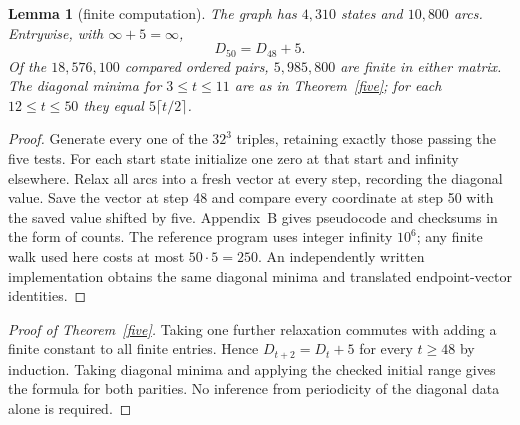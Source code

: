 \documentclass[11pt,a4paper]{article}
\newtheorem{lemma}[theorem]{Lemma}
\begin{document}
\begin{lemma}[finite computation]\label{finite}
The graph has $4{,}310$ states and $10{,}800$ arcs. Entrywise, with $\infty+5=\infty$,
\[
                 D_{50}=D_{48}+5.
\]
Of the $18{,}576{,}100$ compared ordered pairs, $5{,}985{,}800$ are finite in either matrix. The diagonal minima for $3\le t\le11$ are as in Theorem~\ref{five}; for each $12\le t\le50$ they equal $5\lceil t/2\rceil$.
\end{lemma}
\begin{proof}
Generate every one of the $32^3$ triples, retaining exactly those passing the five tests. For each start state initialize one zero at that start and infinity elsewhere. Relax all arcs into a fresh vector at every step, recording the diagonal value. Save the vector at step 48 and compare every coordinate at step 50 with the saved value shifted by five. Appendix~B gives pseudocode and checksums in the form of counts. The reference program uses integer infinity $10^6$; any finite walk used here costs at most $50\cdot5=250$. An independently written implementation obtains the same diagonal minima and translated endpoint-vector identities.
\end{proof}

\begin{proof}[Proof of Theorem~\ref{five}]
Taking one further relaxation commutes with adding a finite constant to all finite entries. Hence $D_{t+2}=D_t+5$ for every $t\ge48$ by induction. Taking diagonal minima and applying the checked initial range gives the formula for both parities. No inference from periodicity of the diagonal data alone is required.
\end{proof}
\clearpage
\appendix
\end{document}

